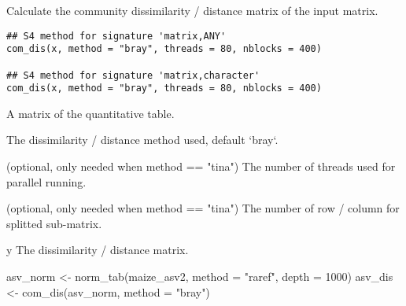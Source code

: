 \documentclass[a4paper]{book}
\begin{document}
%
\begin{Description}\relax
Calculate the community dissimilarity / distance matrix of the input matrix.
\end{Description}
%
\begin{Usage}
\begin{verbatim}
## S4 method for signature 'matrix,ANY'
com_dis(x, method = "bray", threads = 80, nblocks = 400)

## S4 method for signature 'matrix,character'
com_dis(x, method = "bray", threads = 80, nblocks = 400)
\end{verbatim}
\end{Usage}
%
\begin{Arguments}
\begin{ldescription}
\item[\code{x}] A matrix of the quantitative table.

\item[\code{method}] The dissimilarity / distance method used, default `bray`.

\item[\code{threads}] (optional, only needed when method == "tina") The number of
threads used for parallel running.

\item[\code{nblocks}] (optional, only needed when method == "tina") The number of
row / column for splitted sub-matrix.
\end{ldescription}
\end{Arguments}
%
\begin{Value}
y The dissimilarity / distance matrix.
\end{Value}
%
\begin{Examples}
\begin{ExampleCode}
asv_norm <- norm_tab(maize_asv2, method = "raref", depth = 1000)
asv_dis <- com_dis(asv_norm, method = "bray")
\end{ExampleCode}
\end{Examples}
\end{document}
